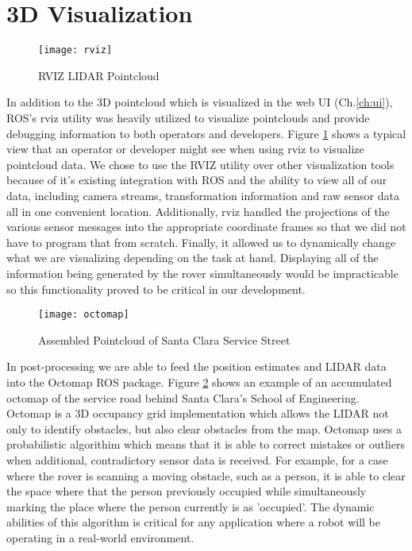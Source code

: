 \section{3D Visualization}

\begin{figure}[H]
	\centerline{\texttt{[image: rviz]}}
	\caption[]{RVIZ LIDAR Pointcloud}
	\label{fig:rviz}
\end{figure}

In addition to the 3D pointcloud which is visualized in the web UI (Ch.\ref{ch:ui}), ROS's rviz utility was heavily utilized to visualize pointclouds and provide debugging information to both operators and developers. Figure \ref{fig:rviz} shows a typical view that an operator or developer might see when using rviz to visualize pointcloud data. We chose to use the RVIZ utility over other visualization tools because of it's existing integration with ROS and the ability to view all of our data, including camera streams, transformation information and raw sensor data all in one convenient location. Additionally, rviz handled the projections of the various sensor messages into the appropriate coordinate frames so that we did not have to program that from scratch. Finally, it allowed us to dynamically change what we are visualizing depending on the task at hand. Displaying all of the information being generated by the rover simultaneously would be impracticable so this functionality proved to be critical in our development. 

\begin{figure}[H]
	\centerline{\texttt{[image: octomap]}}
	\caption[]{Assembled Pointcloud of Santa Clara Service Street}
	\label{fig:octomap}
\end{figure}

In post-processing we are able to feed the position estimates and LIDAR data into the Octomap ROS package. Figure \ref{fig:octomap} shows an example of an accumulated octomap of the service road behind Santa Clara's School of Engineering. Octomap is a 3D occupancy grid implementation which allows the LIDAR not only to identify obstacles, but also clear obstacles from the map. Octomap uses a probabilistic algorithim which means that it is able to correct mistakes or outliers when additional, contradictory sensor data is received. For example, for a case where the rover is scanning a moving obstacle, such as a person, it is able to clear the space where that the person previously occupied while simultaneously marking the place where the person currently is as 'occupied'. The dynamic abilities of this algorithm is critical for any application where a robot will be operating in a real-world environment.

